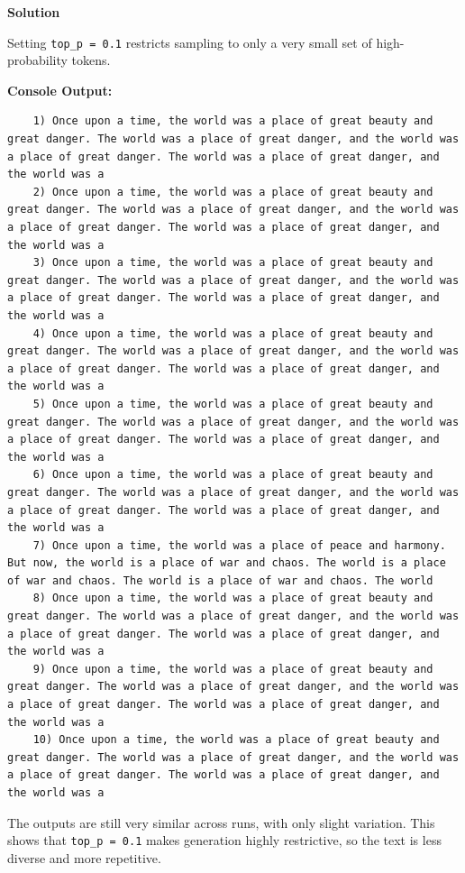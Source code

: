 \documentclass[10pt]{article}
\begin{document}
\textbf{Solution}

Setting \texttt{top\_p = 0.1} restricts sampling to only a very small set of high-probability tokens.

\textbf{Console Output:}
\begin{lstlisting}
	1) Once upon a time, the world was a place of great beauty and great danger. The world was a place of great danger, and the world was a place of great danger. The world was a place of great danger, and the world was a
	2) Once upon a time, the world was a place of great beauty and great danger. The world was a place of great danger, and the world was a place of great danger. The world was a place of great danger, and the world was a
	3) Once upon a time, the world was a place of great beauty and great danger. The world was a place of great danger, and the world was a place of great danger. The world was a place of great danger, and the world was a
	4) Once upon a time, the world was a place of great beauty and great danger. The world was a place of great danger, and the world was a place of great danger. The world was a place of great danger, and the world was a
	5) Once upon a time, the world was a place of great beauty and great danger. The world was a place of great danger, and the world was a place of great danger. The world was a place of great danger, and the world was a
	6) Once upon a time, the world was a place of great beauty and great danger. The world was a place of great danger, and the world was a place of great danger. The world was a place of great danger, and the world was a
	7) Once upon a time, the world was a place of peace and harmony. But now, the world is a place of war and chaos. The world is a place of war and chaos. The world is a place of war and chaos. The world
	8) Once upon a time, the world was a place of great beauty and great danger. The world was a place of great danger, and the world was a place of great danger. The world was a place of great danger, and the world was a
	9) Once upon a time, the world was a place of great beauty and great danger. The world was a place of great danger, and the world was a place of great danger. The world was a place of great danger, and the world was a
	10) Once upon a time, the world was a place of great beauty and great danger. The world was a place of great danger, and the world was a place of great danger. The world was a place of great danger, and the world was a
\end{lstlisting}

The outputs are still very similar across runs, with only slight variation. This shows that \texttt{top\_p = 0.1} makes generation highly restrictive, so the text is less diverse and more repetitive.
\end{document}
